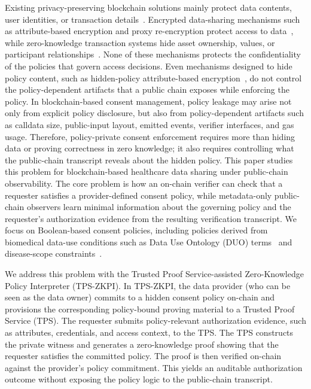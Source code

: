 Existing privacy-preserving blockchain solutions mainly protect data contents, user identities, or transaction details~\cite{rondelet2019zeth, williamson2018aztec,	nadler2023tornado}.
Encrypted data-sharing mechanisms such as attribute-based encryption and proxy re-encryption protect access to data~\cite{ibraimi2009ciphertext, ullah2023survey}, while zero-knowledge transaction systems hide asset ownership, values, or participant relationships~\cite{zhou2024leveraging}.
None of these mechanisms protects the confidentiality of the policies that govern access decisions.
Even mechanisms designed to hide policy content, such as hidden-policy attribute-based encryption~\cite{hu2023access}, do not control the policy-dependent artifacts that a public chain exposes while enforcing the policy.
In blockchain-based consent management, policy leakage may arise not only from explicit policy disclosure, but also from policy-dependent artifacts such as calldata size, public-input layout, emitted events, verifier interfaces, and gas usage.
Therefore, policy-private consent enforcement requires more than hiding data or proving correctness in zero knowledge; it also requires controlling what the public-chain transcript reveals about the hidden policy.
This paper studies this problem for blockchain-based healthcare data sharing under public-chain observability.
The core problem is how an on-chain verifier can check that a requester satisfies a provider-defined consent policy, while metadata-only public-chain observers learn minimal information about the governing policy and the requester's authorization evidence from the resulting verification transcript.
We focus on Boolean-based consent policies, including policies derived from biomedical data-use conditions such as Data Use Ontology (DUO) terms~\cite{lawson2021data} and disease-scope constraints~\cite{WHO_ICD10}.

We address this problem with the Trusted Proof Service-assisted Zero-Knowledge Policy Interpreter (TPS-ZKPI).
In TPS-ZKPI, the data provider (who can be seen as the data owner) commits to a hidden consent policy on-chain and provisions the corresponding policy-bound proving material to a Trusted Proof Service (TPS).
The requester submits policy-relevant authorization evidence, such as attributes, credentials, and access context, to the TPS.
The TPS constructs the private witness and generates a zero-knowledge proof showing that the requester satisfies the committed policy.
The proof is then verified on-chain against the provider's policy commitment.
This yields an auditable authorization outcome without exposing the policy logic to the public-chain transcript.

